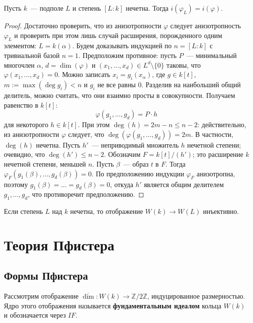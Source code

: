 \documentclass[a4paper,oneside,12pt]{article}
\theoremstyle{plain} { \swapnumbers
\newtheorem{theorem}{Теорема}[subsection]
\newtheorem{corollary}[theorem]{Следствие}
\newtheorem{lemma}[theorem]{Лемма}
\newtheorem{proposition}[theorem]{Утверждение}
\newtheorem{claim}[theorem]{Факт}
}
\theoremstyle{definition} { \swapnumbers
\newtheorem{definition}[theorem]{Определение}
\newtheorem{notation}[theorem]{Обозначение}
\newtheorem{remark}[theorem]{Замечание}
\newtheorem{remarks}[theorem]{Замечания}
\newtheorem{example}[theorem]{Пример}
\newtheorem{examples}[theorem]{Примеры}
\newtheorem{sssection}[theorem]{}
}
\def\ph{\varphi}
\begin{document}
\begin{theorem}[Спрингер]
Пусть $k$~--- подполе $L$ и степень $[L:k]$ нечетна. Тогда $i(\ph_L)=i(\ph)$.
\end{theorem}
\begin{proof}
Достаточно проверить, что из анизотропности $\ph$ следует анизотропность $\ph_L$ и проверить
при этом лишь случай расширения, порожденного одним элементом: $L=k(\alpha)$.
Будем доказывать индукцией по $n=[L:k]$ с тривиальной базой $n=1$.
Предположим противное: пусть $P$~--- минимальный многочлен $\alpha$, $d=\dim(\ph)$ и
$(x_1,\dots,x_d)\in L^d\setminus\{0\}$ таковы, что $\ph(x_1,\dots,x_d)=0$. Можно записать
$x_i=g_i(x_\alpha)$, где $g\in k[t]$, $m:=\max(\deg g_i)<n$ и $g_i$ не все равны 0.
Разделив на наибольший общий делитель, можно считать, что они взаимно просты в совокупности.
Получаем равенство в $k[t]$:
$$
\ph(g_1,\dots,g_d)=P\cdot h
$$
для некоторого $h\in k[t]$. При этом $\deg(h)=2m-n\leq n-2$: действительно, из анизотропности
$\ph$ следует, что $\deg(\ph(g_1,\dots,g_d))=2m$. В частности, $\deg(h)$ нечетна.
Пусть $h'$~--- неприводимый множитель $h$ нечетной степени; очевидно, что $\deg(h')\leq n-2$.
Обозначим $F=k[t]/(h')$; это расширение $k$ нечетной степени, меньшей $n$. Пусть $\beta$~---
образ $t$ в $F$. Тогда $\ph_F(g_1(\beta),\dots,g_d(\beta))=0$. По предположению индукции
$\ph_F$ анизотропна, поэтому $g_1(\beta)=\dots=g_d(\beta)=0$, откуда $h'$ является общим делителем
$g_1,\dots,g_d$, что противоречит предположению.
\end{proof}

\begin{corollary}
Если степень $L$ над $k$ нечетна, то отображение $W(k)\to W(L)$ инъективно.
\end{corollary}

\section{Теория Пфистера}


\subsection{Формы Пфистера}

\begin{definition}\label{def:fundamental_ideal}
Рассмотрим отображение $\overline\dim\colon W(k)\to\mathbb Z/2\mathbb Z$, индуцированное
размерностью. Ядро этого отображения называется {\bf фундаментальным идеалом} кольца $W(k)$
и обозначается через $IF$.
\end{definition}
\end{document}
